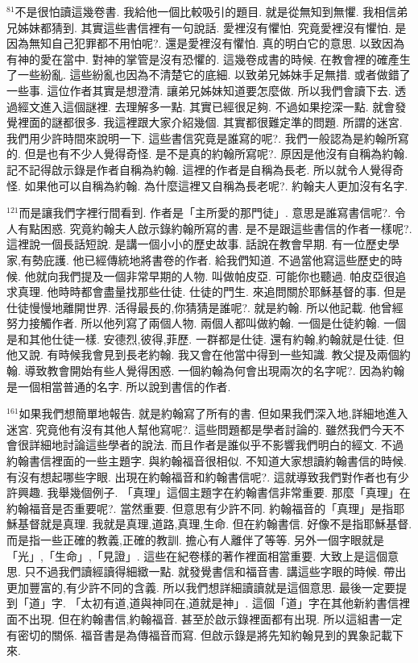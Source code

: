 \documentclass{book}
\begin{document}
$^{81}$不是很怕讀這幾卷書.
我給他一個比較吸引的題目.
就是從無知到無懼.
我相信弟兄姊妹都猜到.
其實這些書信裡有一句說話.
愛裡沒有懼怕.
究竟愛裡沒有懼怕.
是因為無知自己犯罪都不用怕呢?.
還是愛裡沒有懼怕.
真的明白它的意思.
以致因為有神的愛在當中.
對神的掌管是沒有恐懼的.
這幾卷成書的時候.
在教會裡的確產生了一些紛亂.
這些紛亂也因為不清楚它的底細.
以致弟兄姊妹手足無措.
或者做錯了一些事.
這位作者其實是想澄清.
讓弟兄姊妹知道要怎麼做.
所以我們會讀下去.
透過經文進入這個謎裡.
去理解多一點.
其實已經很足夠.
不過如果挖深一點.
就會發覺裡面的謎都很多.
我這裡跟大家介紹幾個.
其實都很難定準的問題.
所謂的迷宮.
我們用少許時間來說明一下.
這些書信究竟是誰寫的呢?.
我們一般認為是約翰所寫的.
但是也有不少人覺得奇怪.
是不是真的約翰所寫呢?.
原因是他沒有自稱為約翰.
記不記得啟示錄是作者自稱為約翰.
這裡的作者是自稱為長老.
所以就令人覺得奇怪.
如果他可以自稱為約翰.
為什麼這裡又自稱為長老呢?.
約翰夫人更加沒有名字.

$^{121}$而是讓我們字裡行間看到.
作者是「主所愛的那門徒」.
意思是誰寫書信呢?.
令人有點困惑.
究竟約翰夫人啟示錄約翰所寫的書.
是不是跟這些書信的作者一樣呢?.
這裡說一個長話短說.
是講一個小小的歷史故事.
話說在教會早期.
有一位歷史學家,有勢庇護.
他已經傳統地將書卷的作者.
給我們知道.
不過當他寫這些歷史的時候.
他就向我們提及一個非常早期的人物.
叫做帕皮亞.
可能你也聽過.
帕皮亞很追求真理.
他時時都會盡量找那些仕徒.
仕徒的門生.
來追問關於耶穌基督的事.
但是仕徒慢慢地離開世界.
活得最長的,你猜猜是誰呢?.
就是約翰.
所以他記載.
他曾經努力接觸作者.
所以他列寫了兩個人物.
兩個人都叫做約翰.
一個是仕徒約翰.
一個是和其他仕徒一樣.
安德烈,彼得,菲歷.
一群都是仕徒.
還有約翰,約翰就是仕徒.
但他又說.
有時候我會見到長老約翰.
我又會在他當中得到一些知識.
教父提及兩個約翰.
導致教會開始有些人覺得困惑.
一個約翰為何會出現兩次的名字呢?.
因為約翰是一個相當普通的名字.
所以說到書信的作者.

$^{161}$如果我們想簡單地報告.
就是約翰寫了所有的書.
但如果我們深入地,詳細地進入迷宮.
究竟他有沒有其他人幫他寫呢?.
這些問題都是學者討論的.
雖然我們今天不會很詳細地討論這些學者的說法.
而且作者是誰似乎不影響我們明白的經文.
不過約翰書信裡面的一些主題字.
與約翰福音很相似.
不知道大家想讀約翰書信的時候.
有沒有想起哪些字眼.
出現在約翰福音和約翰書信呢?.
這就導致我們對作者也有少許興趣.
我舉幾個例子.
「真理」這個主題字在約翰書信非常重要.
那麼「真理」在約翰福音是否重要呢?.
當然重要.
但意思有少許不同.
約翰福音的「真理」是指耶穌基督就是真理.
我就是真理,道路,真理,生命.
但在約翰書信.
好像不是指耶穌基督.
而是指一些正確的教義,正確的教訓.
擔心有人離伴了等等.
另外一個字眼就是「光」,「生命」,「見證」.
這些在紀卷樣的著作裡面相當重要.
大致上是這個意思.
只不過我們讀經讀得細緻一點.
就發覺書信和福音書.
講這些字眼的時候.
帶出更加豐富的,有少許不同的含義.
所以我們想詳細讀讀就是這個意思.
最後一定要提到「道」字.
「太初有道,道與神同在,道就是神」.
這個「道」字在其他新約書信裡面不出現.
但在約翰書信,約翰福音.
甚至於啟示錄裡面都有出現.
所以這組書一定有密切的關係.
福音書是為傳福音而寫.
但啟示錄是將先知約翰見到的異象記載下來.
\end{document}
